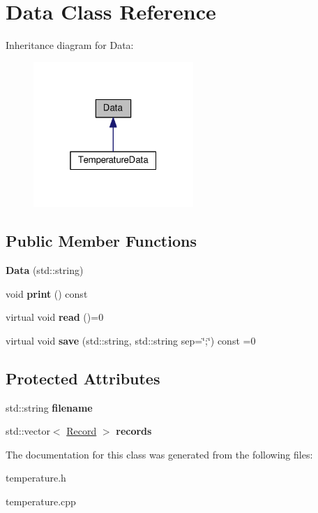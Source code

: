 \hypertarget{classData}{}\section{Data Class Reference}
\label{classData}


Inheritance diagram for Data\+:\nopagebreak
\begin{figure}[H]
\begin{center}
\leavevmode
\includegraphics[width=172pt]{classData__inherit__graph}
\end{center}
\end{figure}
\subsection*{Public Member Functions}
\begin{DoxyCompactItemize}
\item 
{\bfseries Data} (std\+::string)\hypertarget{classData_a619cb123144821ee3cc9082a5e5e468d}{}\label{classData_a619cb123144821ee3cc9082a5e5e468d}

\item 
void {\bfseries print} () const \hypertarget{classData_a28af2f0e4c6ef0b37da0512178ce7b97}{}\label{classData_a28af2f0e4c6ef0b37da0512178ce7b97}

\item 
virtual void {\bfseries read} ()=0\hypertarget{classData_a16a784e96cd5e92785a0c4f2824284c7}{}\label{classData_a16a784e96cd5e92785a0c4f2824284c7}

\item 
virtual void {\bfseries save} (std\+::string, std\+::string sep=\char`\"{};\char`\"{}) const =0\hypertarget{classData_a59eb2ce3d058fed984bad449ae49af5d}{}\label{classData_a59eb2ce3d058fed984bad449ae49af5d}

\end{DoxyCompactItemize}
\subsection*{Protected Attributes}
\begin{DoxyCompactItemize}
\item 
std\+::string {\bfseries filename}\hypertarget{classData_a2cbdf542620c5f62b3e504ea2cecffd0}{}\label{classData_a2cbdf542620c5f62b3e504ea2cecffd0}

\item 
std\+::vector$<$ \hyperlink{structRecord}{Record} $>$ {\bfseries records}\hypertarget{classData_ab886b83cfa461cc7def5c0e8ba870d7c}{}\label{classData_ab886b83cfa461cc7def5c0e8ba870d7c}

\end{DoxyCompactItemize}


The documentation for this class was generated from the following files\+:\begin{DoxyCompactItemize}
\item 
temperature.\+h\item 
temperature.\+cpp\end{DoxyCompactItemize}
